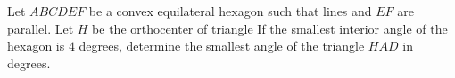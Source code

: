 Let $ABCDEF$ be a convex equilateral hexagon such that lines   and $EF$ are parallel. Let $H$ be the orthocenter of triangle  If the smallest interior angle of the hexagon is $4$ degrees, determine the smallest angle of the triangle $HAD$ in degrees.